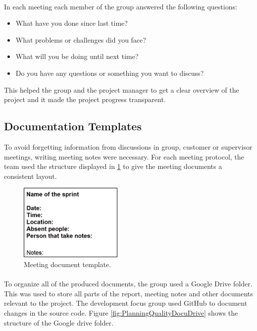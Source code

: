 \paragraph{} In each meeting each member of the group answered the following questions:
\begin{itemize}
  \item What have you done since last time?
  \item What problems or challenges did you face?
  \item What will you be doing until next time?
  \item Do you have any questions or something you want to discuss?
\end{itemize}
This helped the group and the project manager to get a clear overview of the project and it made the project progress transparent.

\subsection{Documentation Templates}
\label{subsec:PlanningQualityDocu}
To avoid forgetting information from discussions in group, customer or supervisor meetings, writing meeting notes were necessary. For each meeting protocol, the team used the structure displayed in \ref{fig:PlanningQualityDocuMeeting} to give the meeting documents a consistent layout.

\begin{figure}[ht!]
\centering
\includegraphics[width=50mm]{./Planning/img/meetingdoctemplate}
\caption{Meeting document template. \label{fig:PlanningQualityDocuMeeting}}
\end{figure}

\paragraph{} To organize all of the produced documents, the group used a Google Drive folder. This was used to store all parts of the report, meeting notes and other documents relevant to the project. The development focus group used GitHub to document changes in the source code. Figure \ref{fig:PlanningQualityDocuDrive} shows the structure of the Google drive folder.

